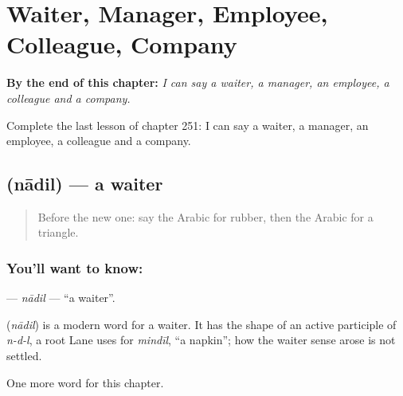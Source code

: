 
\chapter{Waiter, Manager, Employee, Colleague, Company}
\label{ch:ar-waiter-manager-employee-colleague-company}

\begin{chapteropening}
\textbf{By the end of this chapter:} \emph{I can say a waiter, a manager, an employee, a colleague and a company.}

Complete the last lesson of chapter 251: I can say a waiter, a manager, an employee, a colleague and a company.
\end{chapteropening}

\section[\texorpdfstring{\ar{نادل} (nādil)}{نادل (nādil)}]{ (nādil) — a waiter}

\label{lesson:AR-C251-nadil}



\begin{quote}
Before the new one: say the Arabic for rubber, then the Arabic for a triangle.
\end{quote}

\subsection*{You'll want to know: }
\textbf{} — \emph{nādil} — \textquotedblleft{}a waiter\textquotedblright{}.

\begin{cousinweb}
\textbf{} (\emph{nādil}) is a modern word for a waiter. It has the shape of an active participle of \emph{n-d-l}, a root Lane uses for \emph{mindīl}, \textquotedblleft{}a napkin\textquotedblright{}; how the waiter sense arose is not settled.
\end{cousinweb}

\begin{grammarlens}[title={What you've built}]
One more word for this chapter.
\end{grammarlens}

